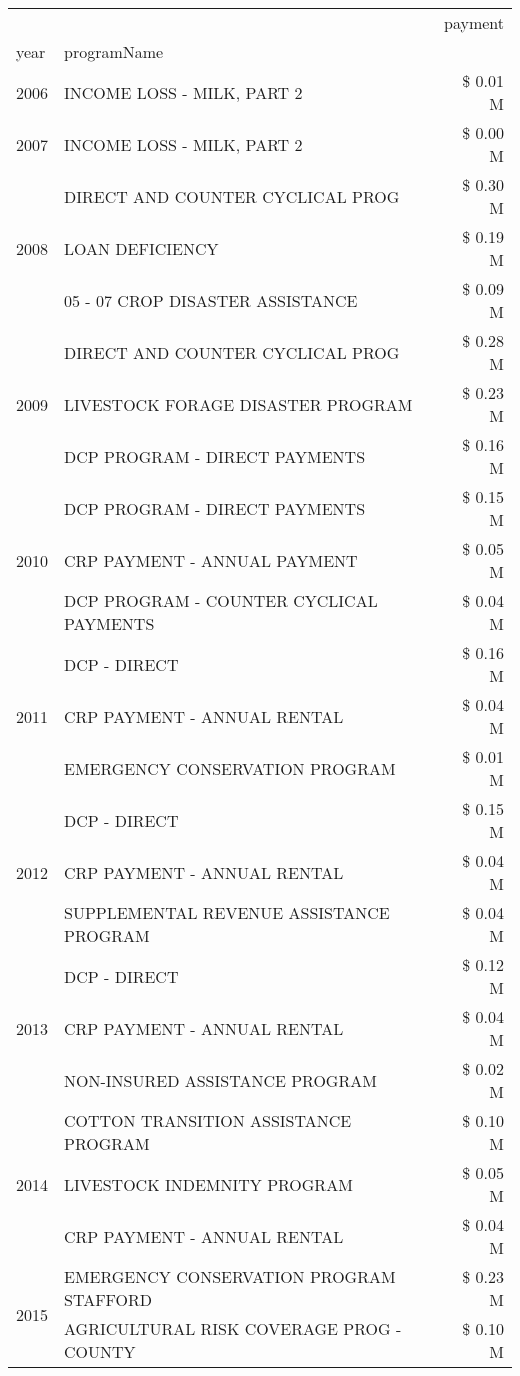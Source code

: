 \begin{tabular}{llr}
\toprule
 &  & payment \\
year & programName &  \\
\midrule
2006 & INCOME LOSS - MILK, PART 2 & \$ 0.01 M \\
\cline{1-3}
2007 & INCOME LOSS - MILK, PART 2 & \$ 0.00 M \\
\cline{1-3}
\multirow[t]{3}{*}{2008} & DIRECT AND COUNTER CYCLICAL PROG & \$ 0.30 M \\
 & LOAN DEFICIENCY & \$ 0.19 M \\
 & 05 - 07 CROP DISASTER ASSISTANCE & \$ 0.09 M \\
\cline{1-3}
\multirow[t]{3}{*}{2009} & DIRECT AND COUNTER CYCLICAL PROG & \$ 0.28 M \\
 & LIVESTOCK FORAGE DISASTER  PROGRAM & \$ 0.23 M \\
 & DCP PROGRAM - DIRECT PAYMENTS & \$ 0.16 M \\
\cline{1-3}
\multirow[t]{3}{*}{2010} & DCP PROGRAM - DIRECT PAYMENTS & \$ 0.15 M \\
 & CRP PAYMENT - ANNUAL PAYMENT & \$ 0.05 M \\
 & DCP PROGRAM - COUNTER CYCLICAL PAYMENTS & \$ 0.04 M \\
\cline{1-3}
\multirow[t]{3}{*}{2011} & DCP - DIRECT & \$ 0.16 M \\
 & CRP PAYMENT - ANNUAL RENTAL & \$ 0.04 M \\
 & EMERGENCY CONSERVATION PROGRAM & \$ 0.01 M \\
\cline{1-3}
\multirow[t]{3}{*}{2012} & DCP - DIRECT & \$ 0.15 M \\
 & CRP PAYMENT - ANNUAL RENTAL & \$ 0.04 M \\
 & SUPPLEMENTAL REVENUE ASSISTANCE PROGRAM & \$ 0.04 M \\
\cline{1-3}
\multirow[t]{3}{*}{2013} & DCP - DIRECT & \$ 0.12 M \\
 & CRP PAYMENT - ANNUAL RENTAL & \$ 0.04 M \\
 & NON-INSURED ASSISTANCE PROGRAM & \$ 0.02 M \\
\cline{1-3}
\multirow[t]{3}{*}{2014} & COTTON TRANSITION ASSISTANCE PROGRAM & \$ 0.10 M \\
 & LIVESTOCK INDEMNITY PROGRAM & \$ 0.05 M \\
 & CRP PAYMENT - ANNUAL RENTAL & \$ 0.04 M \\
\cline{1-3}
\multirow[t]{3}{*}{2015} & EMERGENCY CONSERVATION PROGRAM STAFFORD & \$ 0.23 M \\
 & AGRICULTURAL RISK COVERAGE PROG - COUNTY & \$ 0.10 M \\

\end{tabular}
